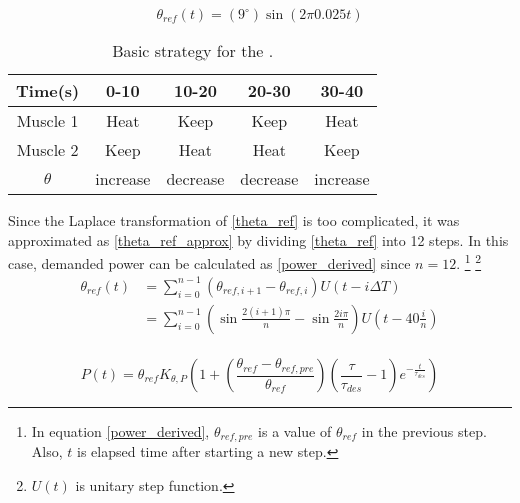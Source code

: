 \begin{equation}\label{theta_ref}
\theta_{ref}(t)=(9^{\circ})\sin(2\pi 0.025t)
\end{equation}

\begin{table}[t]
	\caption{Basic strategy for the \apc.}
	\label{table_apc_basic}
	\begin{center}
		\begin{tabular}{c||c|c|c|c}
			\hline
			Time(s) & 0-10 & 10-20 & 20-30 & 30-40 \\
			\hline
			Muscle 1 & Heat & Keep & Keep & Heat \\
			Muscle 2 & Keep & Heat & Heat & Keep \\
			\hline
			$\theta$ & increase & decrease & decrease & increase \\
			\hline
		\end{tabular}
	\end{center}
\end{table}

Since the Laplace transformation of \eqref{theta_ref} is too complicated, 
it was approximated as \eqref{theta_ref_approx} by dividing \eqref{theta_ref} into 12 steps. In this case, demanded power can be calculated as \eqref{power_derived} since $n=12$. 
\footnote{In equation \eqref{power_derived}, $\theta_{ref,pre}$ is a value of $\theta_{ref}$ in the previous step. Also, $t$ is elapsed time after starting a new step.}
\footnote{$U(t)$ is unitary step function.}
\begin{equation} \label{theta_ref_approx}
\begin{aligned} 
\theta_{ref}(t) & = \sum_{i=0}^{n-1}{(\theta_{ref,i+1}-\theta_{ref,i})U(t-i\Delta T)} \\
& = \sum_{i=0}^{n-1}{\left(\sin{\frac{2(i+1)\pi}{n}}-\sin{\frac{2i\pi}{n}}\right)U\left(t-40\frac{i}{n}\right)} \\
\end{aligned}
\end{equation}

\begin{equation} \label{power_derived}
P(t)=\theta_{ref}K_{\theta,P}\left(1+\left(\frac{\theta_{ref}-\theta_{ref,pre}}{\theta_{ref}}\right)\left(\frac{\tau}{\tau_{des}}-1\right)e^{-\frac{t}{\tau_{des}}}\right)
\end{equation}



